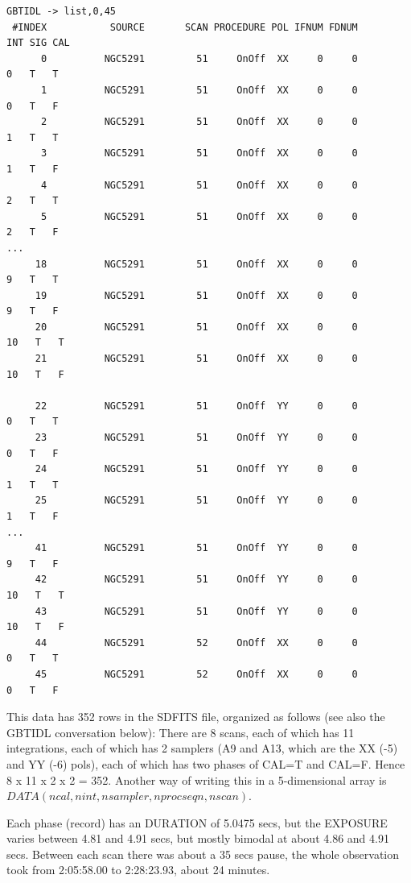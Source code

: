 \documentclass[12pt,a4paper]{article}
\begin{document}
\begin{lstlisting}  
GBTIDL -> list,0,45
 #INDEX           SOURCE       SCAN PROCEDURE POL IFNUM FDNUM        INT SIG CAL
      0          NGC5291         51     OnOff  XX     0     0          0   T   T
      1          NGC5291         51     OnOff  XX     0     0          0   T   F
      2          NGC5291         51     OnOff  XX     0     0          1   T   T
      3          NGC5291         51     OnOff  XX     0     0          1   T   F
      4          NGC5291         51     OnOff  XX     0     0          2   T   T
      5          NGC5291         51     OnOff  XX     0     0          2   T   F
...
     18          NGC5291         51     OnOff  XX     0     0          9   T   T
     19          NGC5291         51     OnOff  XX     0     0          9   T   F
     20          NGC5291         51     OnOff  XX     0     0         10   T   T
     21          NGC5291         51     OnOff  XX     0     0         10   T   F
     
     22          NGC5291         51     OnOff  YY     0     0          0   T   T
     23          NGC5291         51     OnOff  YY     0     0          0   T   F
     24          NGC5291         51     OnOff  YY     0     0          1   T   T
     25          NGC5291         51     OnOff  YY     0     0          1   T   F
...
     41          NGC5291         51     OnOff  YY     0     0          9   T   F
     42          NGC5291         51     OnOff  YY     0     0         10   T   T
     43          NGC5291         51     OnOff  YY     0     0         10   T   F
     44          NGC5291         52     OnOff  XX     0     0          0   T   T
     45          NGC5291         52     OnOff  XX     0     0          0   T   F
\end{lstlisting}

This data has 352 rows in the SDFITS file, organized as follows (see also the GBTIDL
conversation below):  There are 8 scans, each of which has 11 integrations, each of
which has 2 samplers (A9 and A13, which are the XX (-5) and YY (-6) pols), each of which has
two phases of CAL=T and CAL=F. Hence 8 x 11 x 2 x 2 = 352. Another way of writing this in a
5-dimensional array is $DATA(ncal,nint,nsampler,nprocseqn,nscan)$.

Each phase (record) has an DURATION
of 5.0475 secs, but the EXPOSURE varies between 4.81 and 4.91 secs, but mostly bimodal
at about 4.86 and 4.91 secs.  Between each scan there was about a 35 secs pause, the
whole observation took from 2:05:58.00 to 2:28:23.93, about 24 minutes.
\end{document}
